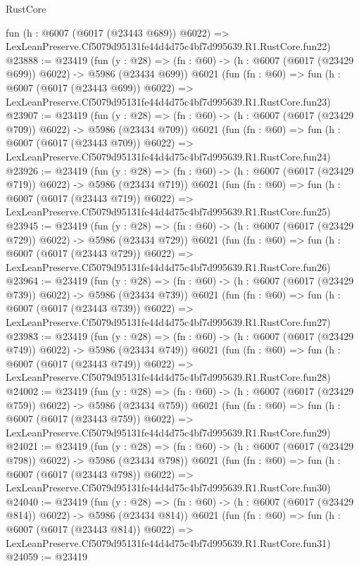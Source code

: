 \begin{lexlean}{RustCore}
\begin{coremodule}
    fun (h : @6007 (@6017 (@23443 @689)) @6022) =>
    LexLeanPreserve.Cf5079d95131fe44d4d75c4bf7d995639.R1.RustCore.fun22)
@23888 := @23419
    (fun (y : @28) => (fn : @60) -> (h : @6007 (@6017 (@23429 @699)) @6022) -> @5986 (@23434 @699))
    @6021
    (fun (fn : @60) =>
    fun (h : @6007 (@6017 (@23443 @699)) @6022) =>
    LexLeanPreserve.Cf5079d95131fe44d4d75c4bf7d995639.R1.RustCore.fun23)
@23907 := @23419
    (fun (y : @28) => (fn : @60) -> (h : @6007 (@6017 (@23429 @709)) @6022) -> @5986 (@23434 @709))
    @6021
    (fun (fn : @60) =>
    fun (h : @6007 (@6017 (@23443 @709)) @6022) =>
    LexLeanPreserve.Cf5079d95131fe44d4d75c4bf7d995639.R1.RustCore.fun24)
@23926 := @23419
    (fun (y : @28) => (fn : @60) -> (h : @6007 (@6017 (@23429 @719)) @6022) -> @5986 (@23434 @719))
    @6021
    (fun (fn : @60) =>
    fun (h : @6007 (@6017 (@23443 @719)) @6022) =>
    LexLeanPreserve.Cf5079d95131fe44d4d75c4bf7d995639.R1.RustCore.fun25)
@23945 := @23419
    (fun (y : @28) => (fn : @60) -> (h : @6007 (@6017 (@23429 @729)) @6022) -> @5986 (@23434 @729))
    @6021
    (fun (fn : @60) =>
    fun (h : @6007 (@6017 (@23443 @729)) @6022) =>
    LexLeanPreserve.Cf5079d95131fe44d4d75c4bf7d995639.R1.RustCore.fun26)
@23964 := @23419
    (fun (y : @28) => (fn : @60) -> (h : @6007 (@6017 (@23429 @739)) @6022) -> @5986 (@23434 @739))
    @6021
    (fun (fn : @60) =>
    fun (h : @6007 (@6017 (@23443 @739)) @6022) =>
    LexLeanPreserve.Cf5079d95131fe44d4d75c4bf7d995639.R1.RustCore.fun27)
@23983 := @23419
    (fun (y : @28) => (fn : @60) -> (h : @6007 (@6017 (@23429 @749)) @6022) -> @5986 (@23434 @749))
    @6021
    (fun (fn : @60) =>
    fun (h : @6007 (@6017 (@23443 @749)) @6022) =>
    LexLeanPreserve.Cf5079d95131fe44d4d75c4bf7d995639.R1.RustCore.fun28)
@24002 := @23419
    (fun (y : @28) => (fn : @60) -> (h : @6007 (@6017 (@23429 @759)) @6022) -> @5986 (@23434 @759))
    @6021
    (fun (fn : @60) =>
    fun (h : @6007 (@6017 (@23443 @759)) @6022) =>
    LexLeanPreserve.Cf5079d95131fe44d4d75c4bf7d995639.R1.RustCore.fun29)
@24021 := @23419
    (fun (y : @28) => (fn : @60) -> (h : @6007 (@6017 (@23429 @798)) @6022) -> @5986 (@23434 @798))
    @6021
    (fun (fn : @60) =>
    fun (h : @6007 (@6017 (@23443 @798)) @6022) =>
    LexLeanPreserve.Cf5079d95131fe44d4d75c4bf7d995639.R1.RustCore.fun30)
@24040 := @23419
    (fun (y : @28) => (fn : @60) -> (h : @6007 (@6017 (@23429 @814)) @6022) -> @5986 (@23434 @814))
    @6021
    (fun (fn : @60) =>
    fun (h : @6007 (@6017 (@23443 @814)) @6022) =>
    LexLeanPreserve.Cf5079d95131fe44d4d75c4bf7d995639.R1.RustCore.fun31)
@24059 := @23419

\end{coremodule}
\end{lexlean}
